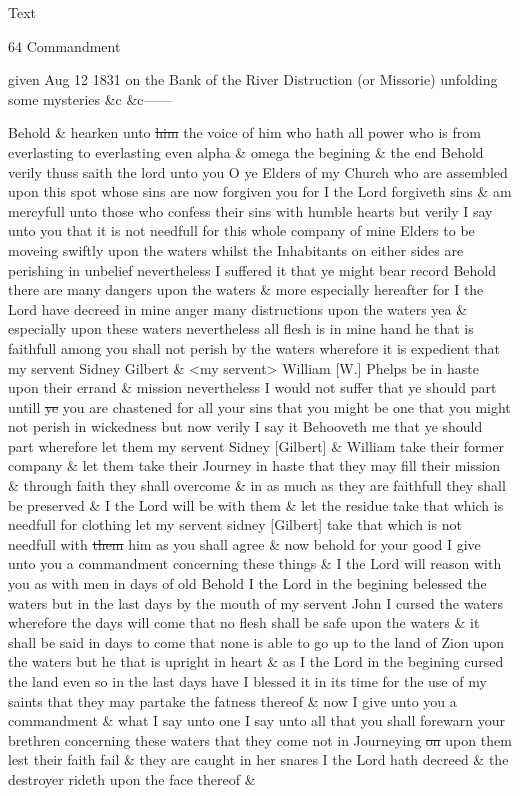 {			\begin{description}
				\item[Text]
			\end{description}
			
				\begin{tightcenter}
				64 Commandment
				\end{tightcenter}
				
				given Aug 12 1831 on the Bank of the River Distruction (or Missorie) unfolding some mysteries \&c \&c------
				
				Behold \& hearken unto \sout{him} the voice of him who hath all power who is from everlasting to everlasting even alpha \& omega the begining \& the end Behold verily thuss saith the lord unto you O ye Elders of my Church who are assembled upon this spot whose sins are now forgiven you for I the Lord forgiveth sins \& am mercyfull unto those who confess their sins with humble hearts but verily I say unto you that it is not needfull for this whole company of mine Elders to be moveing swiftly upon the waters whilst the Inhabitants on either sides are perishing in unbelief nevertheless I suffered it that ye might bear record Behold there are many dangers upon the waters \& more especially hereafter for I the Lord have decreed in mine anger many distructions upon the waters yea \& especially upon these waters nevertheless all flesh is in mine hand he that is faithfull among you shall not perish by the waters wherefore it is expedient that my servent Sidney Gilbert \& <my servent> William [W.] Phelps be in haste upon their errand \& mission nevertheless I would not suffer that ye should part untill \sout{ye} you are chastened for all your sins that you might be one that you might not perish in wickedness but now verily I say it Behooveth me that ye should part wherefore let them my servent Sidney [Gilbert] \& William take their former company \& let them take their Journey in haste that they may fill their mission \& through faith they shall overcome \& in as much as they are faithfull they shall be preserved \& I the Lord will be with them \& let the residue take that which is needfull for clothing let my servent sidney [Gilbert] take that which is not needfull with \sout{them} him as you shall agree \& now behold for your good I give unto you a commandment concerning these things \& I the Lord will reason with you as with men in days of old Behold I the Lord in the begining belessed the waters but in the last days by the mouth of my servent John I cursed the waters wherefore the days will come that no flesh shall be safe upon the waters \& it shall be said in days to come that none is able to go up to the land of Zion upon the waters but he that is upright in heart \& as I the Lord in the begining cursed the land even so in the last days have I blessed it in its time for the use of my saints that they may partake the fatness thereof \& now I give unto you a commandment \& what I say unto one I say unto all that you shall forewarn your brethren concerning these waters that they come not in Journeying \sout{on} upon them lest their faith fail \& they are caught in her snares I the Lord hath decreed \& the destroyer rideth upon the face thereof \& }
